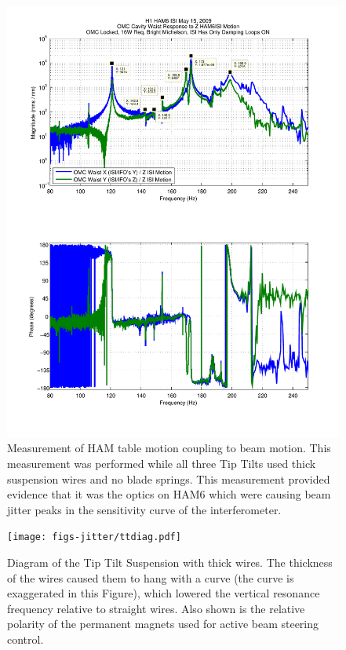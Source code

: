 \begin{figure}
  \begin{center}
  \leavevmode
  \includegraphics[width=\textwidth]{figs-jitter/TTbounceTF.pdf}
  \end{center}
  \caption[Measurement of HAM table motion coupling to beam motion.]{Measurement of HAM table motion coupling to beam motion. This measurement was performed while all three Tip Tilts used thick suspension wires and no blade springs. This measurement provided evidence that it was the optics on HAM6 which were causing beam jitter peaks in the sensitivity curve of the interferometer.}
  \label{fig:TTbounceTF}
\end{figure}

\begin{figure}
  \begin{center}
  \leavevmode
  \texttt{[image: figs-jitter/ttdiag.pdf]}
  \end{center}
  \caption[Diagram of the Tip Tilt suspension with thick wires.]{Diagram of the Tip Tilt Suspension with thick wires. The thickness of the wires caused them to hang with a curve (the curve is exaggerated in this Figure), which lowered the vertical resonance frequency relative to straight wires. Also shown is the relative polarity of the permanent magnets used for active beam steering control.}
  \label{fig:ttdiag}
\end{figure}

